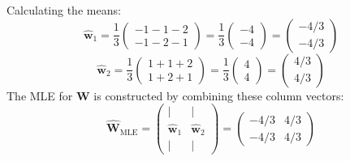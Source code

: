 \documentclass[11pt, a4paper, oneside]{memoir}
\begin{document}
Calculating the means:
\[ \hat{\mathbf{w}}_1 = \frac{1}{3} \begin{pmatrix} -1-1-2 \\ -1-2-1 \end{pmatrix} = \frac{1}{3} \begin{pmatrix} -4 \\ -4 \end{pmatrix} = \begin{pmatrix} -4/3 \\ -4/3 \end{pmatrix} \]
\[ \hat{\mathbf{w}}_2 = \frac{1}{3} \begin{pmatrix} 1+1+2 \\ 1+2+1 \end{pmatrix} = \frac{1}{3} \begin{pmatrix} 4 \\ 4 \end{pmatrix} = \begin{pmatrix} 4/3 \\ 4/3 \end{pmatrix} \]
The MLE for $\mathbf{W}$ is constructed by combining these column vectors:
\[ \hat{\mathbf{W}}_{\text{MLE}} = \begin{pmatrix} | & | \\ \hat{\mathbf{w}}_1 & \hat{\mathbf{w}}_2 \\ | & | \end{pmatrix} = \begin{pmatrix} -4/3 & 4/3 \\ -4/3 & 4/3 \end{pmatrix} \]
\end{document}
